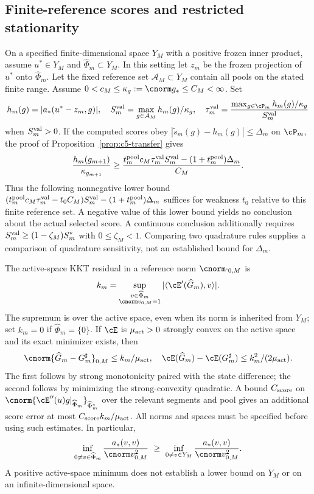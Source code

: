 \documentclass[11pt]{article}
\theoremstyle{remark}
\begin{document}
\subsection{Finite-reference scores and restricted stationarity}
\label{sec:c5-validation}

On a specified finite-dimensional space $Y_M$ with a positive frozen inner
product, assume $u^*\in Y_M$ and $\widehat\Phi_m\subset Y_M$.
In this setting let $z_m$ be the frozen projection of $u^*$ onto
$\widehat\Phi_m$. Let the fixed reference set $\mathcal A_M\subset Y_M$
contain all pools on the stated finite range.
Assume $0<c_M\leq\kappa_g:=\cnorm g_*\leq C_M<\infty$.
Set
\[
 h_m(g)=|a_*(u^*-z_m,g)|,\quad
 S_m^{\rm val}=\max_{g\in\mathcal A_M}h_m(g)/\kappa_g,\quad
 \tau_m^{\rm val}
   =\frac{\max_{g\in\cP_m}h_m(g)/\kappa_g}{S_m^{\rm val}}
\]
when $S_m^{\rm val}>0$.
If the computed scores obey
$|\widetilde s_m(g)-h_m(g)|\leq\Delta_m$ on $\cP_m$, the proof of
Proposition~\ref{prop:c5-transfer} gives
\begin{equation}
 \frac{h_m(g_{m+1})}{\kappa_{g_{m+1}}}
 \geq
 \frac{t_m^{\rm pool}c_M\tau_m^{\rm val}S_m^{\rm val}
             -(1+t_m^{\rm pool})\Delta_m}{C_M}.
 \label{eq:c5-finite-margin}
\end{equation}
Thus the following nonnegative lower bound
$(t_m^{\rm pool}c_M\tau_m^{\rm val}-t_0C_M)S_m^{\rm val}
 -(1+t_m^{\rm pool})\Delta_m$ suffices for weakness $t_0$
relative to this finite reference set.
A negative value of this lower bound yields no conclusion about the actual selected score.
A continuous conclusion additionally requires
$S_m^{\rm val}\geq(1-\zeta_M)S_m^*$ with $0\leq\zeta_M<1$.
Comparing two quadrature rules supplies a comparison of quadrature sensitivity, not an established bound for $\Delta_m$.

The active-space KKT residual in a reference norm $\cnorm\cdot_{0,M}$ is
\begin{equation}
 k_m=\sup_{\substack{v\in\widehat\Phi_m\\\cnorm v_{0,M}=1}}
              |\langle\cE'(\widehat G_m),v\rangle|.
 \label{eq:c5-kkt}
\end{equation}
The supremum is over the active space, even when its norm is inherited
from $Y_M$; set $k_m=0$ if $\widehat\Phi_m=\{0\}$.
If $\cE$ is $\mu_{\rm act}>0$ strongly convex on the active
space and its exact minimizer exists, then
\[
 \cnorm{\widehat G_m-G_m^\sharp}_{0,M}\leq k_m/\mu_{\rm act},\quad
 \cE(\widehat G_m)-\cE(G_m^\sharp)\leq k_m^2/(2\mu_{\rm act}).
\]
The first follows by strong monotonicity paired with the state difference;
the second follows by minimizing the strong-convexity quadratic.
A bound $C_{\rm score}$ on
$\cnorm{\cE''(u)g|_{\widehat\Phi_m}}_{\widehat\Phi_m^*}$ over the
relevant segments and pool gives an additional score error at most
$C_{\rm score}k_m/\mu_{\rm act}$.
All norms and spaces must be specified before using such estimates.
In particular,
\[
 \inf_{0\ne v\in\widehat\Phi_m}\frac{a_*(v,v)}{\cnorm v_{0,M}^2}
 \ \geq\
 \inf_{0\ne v\in Y_M}\frac{a_*(v,v)}{\cnorm v_{0,M}^2}.
\]
A positive active-space minimum does not establish a lower bound on $Y_M$
or on an infinite-dimensional space.
\end{document}
